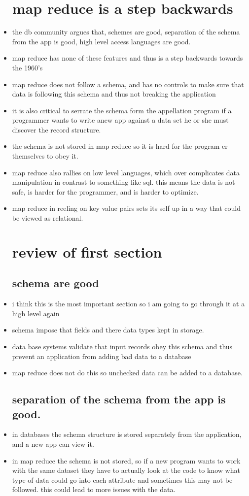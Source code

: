 \documentclass{article}
\begin{document}
\begin{itemize}
\section{map reduce is a step backwards}
\item the db community argues that, schemes are good, separation of the schema from the app is good, high level access languages are good. 
\item map reduce has none of these features and thus is a step backwards towards the 1960's
\item map reduce does not follow a schema, and has no controls to make sure that data is following this schema and thus not breaking the application
\item it is also critical to serrate the schema form the appellation program if a programmer wants to write  anew app against a data set he or she must discover the record structure. 
\item the schema is not stored in map reduce so it is hard for the program er themselves to obey it.
\item map reduce also rallies on low level languages, which over complicates data manipulation in contrast to something like sql. this means the data is not safe, is harder for the programmer, and is harder to optimize. 
\item map reduce in reeling on key value pairs sets its self up in a way that could be viewed as relational.
\section{review of first section}
\subsection{schema are good}
\item i think this is the most important section so i am going to go through it at a high level again 
\item schema impose that fields and there data types kept in storage. 
\item data base systems validate that input records obey this schema and thus prevent an application from adding bad data to a database 
\item map reduce does not do this so unchecked data can be added to a database. 
\subsection{separation of the schema from the app is good.}
\item in databases the schema structure is stored separately from the application, and a new app can view it. 
\item in map reduce the schema is not stored, so if a new program wants to work with the same dataset they have to actually look at the code to know what type of data could go into each attribute and sometimes this may not be followed. this could lead to more issues with the data. 

\end{itemize}
\end{document}
